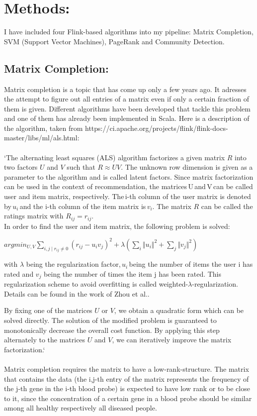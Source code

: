 \documentclass{bioinfo}
\begin{document}
 

\section{Methods:}
 

I have included four Flink-based algorithms into my pipeline: Matrix Completion, SVM (Support Vector Machines), PageRank and Community Detection.

 

\subsection{Matrix Completion: }
\label{matrixcompletion_algo}

  

Matrix completion is a topic that has come up only a few years ago. It adresses the attempt to figure out all entries of a matrix even if only a certain fraction of them is given. Different algorithms have been developed that tackle this problem and one of them has already been implemented in Scala. Here is a description of the algorithm, taken from https://ci.apache.org/projects/flink/flink-docs-master/libs/ml/als.html: \\\\
`The alternating least squares (ALS) algorithm factorizes a given matrix $R$ into two factors $U$ and $V$ such that $R\approx UV$. The unknown row dimension is given as a parameter to the algorithm and is called latent factors. Since matrix factorization can be used in the context of recommendation, the matrices U and V can be called user and item matrix, respectively. The i-th column of the user matrix is denoted by $u_i$ and the i-th column of the item matrix is $v_i$. The matrix $R$ can be called the ratings matrix with $R_{ij} =r_{ij}$.\\
In order to find the user and item matrix, the following problem is solved: 

$ argmin_{U,V} \sum_{i,j\mid r_{ij} \neq0}(r_{ij}−u_i v_j)^{2}+\lambda(\sum_i \Vert u_i\Vert ^{2}+\sum_j \Vert v_j \Vert ^{2}) $

with $\lambda$ being the regularization factor, $u_i$ being the number of items the user i has rated and $v_j$ being the number of times the item j has been rated. This regularization scheme to avoid overfitting is called weighted-$\lambda$-regularization. Details can be found in the work of Zhou et al.. 

By fixing one of the matrices $U$ or $V$, we obtain a quadratic form which can be solved directly. The solution of the modified problem is guaranteed to monotonically decrease the overall cost function. By applying this step alternately to the matrices $U$ and $V$, we can iteratively improve the matrix factorization.`\\\\
Matrix completion requires the matrix to have a low-rank-structure. The matrix that contains the data (the i,j-th entry of the matrix represents the frequency of the j-th gene in the i-th blood probe) is expected to have low rank or to be close to it, since the concentration of a certain gene in a blood probe should be similar among all healthy respectively all diseased people. 
\end{document}
